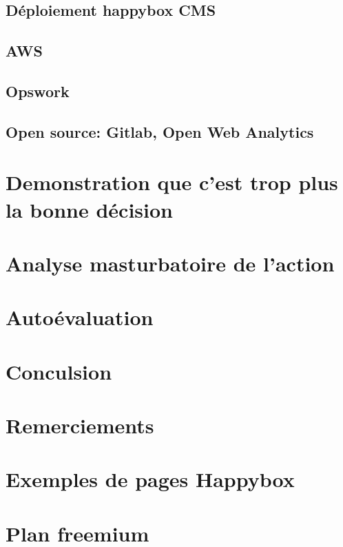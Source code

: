 \documentclass[11pt, a4paper ]{article}
\let\stdsection\section
\renewcommand\section{\newpage\stdsection}
\begin{document}
\begin{spacing}{1.5}
			\subsection{Déploiement happybox CMS}
			\subsection{AWS}

			\subsection{Opswork}

			\subsection{Open source: Gitlab, Open Web Analytics}

		\section{Demonstration que c'est trop plus la bonne décision} %

		\section{Analyse masturbatoire de l'action} %

		\section{Autoévaluation}

	\section{Conculsion} %

	\section{Remerciements}

	\appendix
	\section{Exemples de pages Happybox}

	\section{Plan freemium}
	\printindex

	
	
\end{spacing}
\end{document}
